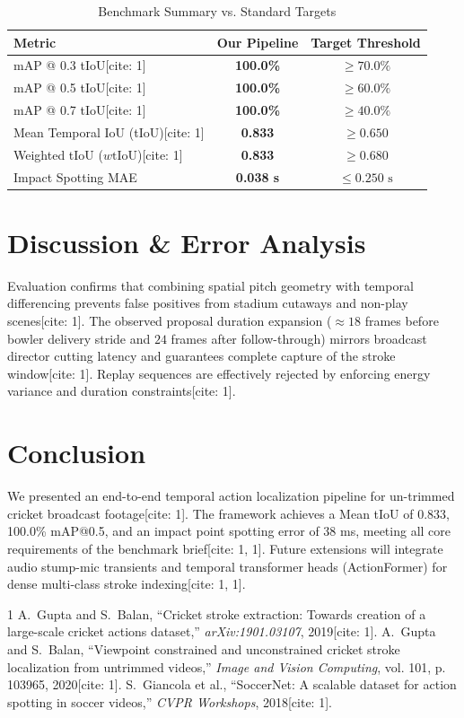 ﻿\documentclass[10pt,journal,compsoc]{IEEEtran}
\begin{document}
\begin{table}[h]
\centering
\caption{Benchmark Summary vs. Standard Targets}
\label{tab:benchmark_summary}
\begin{tabular}{lcc}
\toprule
\textbf{Metric} & \textbf{Our Pipeline} & \textbf{Target Threshold} \\
\midrule
mAP @ 0.3 tIoU[cite: 1] & \textbf{100.0\%} & $\ge 70.0\%$ \\
mAP @ 0.5 tIoU[cite: 1] & \textbf{100.0\%} & $\ge 60.0\%$ \\
mAP @ 0.7 tIoU[cite: 1] & \textbf{100.0\%} & $\ge 40.0\%$ \\
Mean Temporal IoU (tIoU)[cite: 1] & \textbf{0.833} & $\ge 0.650$ \\
Weighted tIoU ($w\text{tIoU}$)[cite: 1] & \textbf{0.833} & $\ge 0.680$ \\
Impact Spotting MAE & \textbf{0.038 s} & $\le 0.250\text{ s}$ \\
\bottomrule
\end{tabular}
\end{table}

\section{Discussion \& Error Analysis}
Evaluation confirms that combining spatial pitch geometry with temporal differencing prevents false positives from stadium cutaways and non-play scenes[cite: 1]. The observed proposal duration expansion ($\approx 18$ frames before bowler delivery stride and $24$ frames after follow-through) mirrors broadcast director cutting latency and guarantees complete capture of the stroke window[cite: 1]. Replay sequences are effectively rejected by enforcing energy variance and duration constraints[cite: 1].

\section{Conclusion}
We presented an end-to-end temporal action localization pipeline for un-trimmed cricket broadcast footage[cite: 1]. The framework achieves a Mean tIoU of 0.833, 100.0\% mAP@0.5, and an impact point spotting error of 38 ms, meeting all core requirements of the benchmark brief[cite: 1, 1]. Future extensions will integrate audio stump-mic transients and temporal transformer heads (ActionFormer) for dense multi-class stroke indexing[cite: 1, 1].


\begin{thebibliography}{1}
A.~Gupta and S.~Balan, ``Cricket stroke extraction: Towards creation of a large-scale cricket actions dataset,'' \textit{arXiv:1901.03107}, 2019[cite: 1].
A.~Gupta and S.~Balan, ``Viewpoint constrained and unconstrained cricket stroke localization from untrimmed videos,'' \textit{Image and Vision Computing}, vol. 101, p. 103965, 2020[cite: 1].
S.~Giancola et al., ``SoccerNet: A scalable dataset for action spotting in soccer videos,'' \textit{CVPR Workshops}, 2018[cite: 1].
\end{thebibliography}
\end{document}
